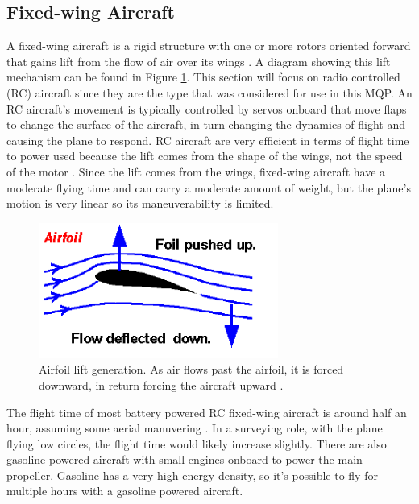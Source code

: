 \subsection{Fixed-wing Aircraft}
A fixed-wing aircraft is a rigid structure with one or more rotors oriented forward that gains lift from the flow of air over its wings \cite{airplane_book}. A diagram showing this lift mechanism can be found in Figure \ref{fig:airfoil_lift}. This section will focus on radio controlled (RC) aircraft since they are the type that was considered for use in this MQP. An RC aircraft’s movement is typically controlled by servos onboard that move flaps to change the surface of the aircraft, in turn changing the dynamics of flight and causing the plane to respond. RC aircraft are very efficient in terms of flight time to power used because the lift comes from the shape of the wings, not the speed of the motor \cite{airplane_site}. Since the lift comes from the wings, fixed-wing aircraft have a moderate flying time and can carry a moderate amount of weight, but the plane’s motion is very linear so its maneuverability is limited.\par
\begin{figure}[ht]
\centering
\includegraphics[width=0.70\textwidth]{img/airfoil_lift.png}
\caption{Airfoil lift generation. As air flows past the airfoil, it is forced downward, in return forcing the aircraft upward \cite{wing_lift_diagram}.}
\label{fig:airfoil_lift}
\end{figure}\par
The flight time of most battery powered RC fixed-wing aircraft is around half an hour, assuming some aerial manuvering \cite{airplane_book}. In a surveying role, with the plane flying low circles, the flight time would likely increase slightly. There are also gasoline powered aircraft with small engines onboard to power the main propeller. Gasoline has a very high energy density, so it’s possible to fly for multiple hours with a gasoline powered aircraft.\par
